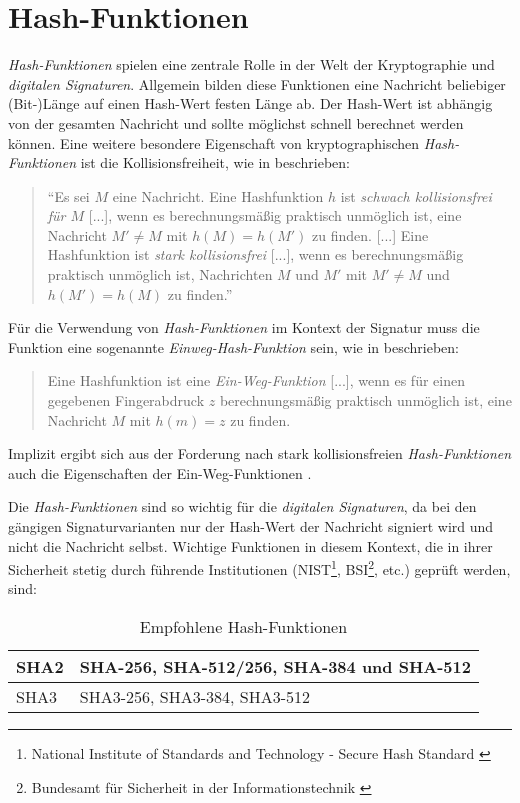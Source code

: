 \documentclass[11pt,a4paper,ngerman]{report}
\begin{document}
\section{Hash-Funktionen}\label{Hash-Funktionen}
\textit{Hash-Funktionen} spielen eine zentrale Rolle in der Welt der Kryptographie und \textit{digitalen Signaturen}. Allgemein bilden diese Funktionen eine Nachricht beliebiger (Bit-)Länge auf einen Hash-Wert festen Länge ab. Der Hash-Wert ist abhängig von der gesamten Nachricht und sollte möglichst schnell berechnet werden können. Eine weitere besondere Eigenschaft von kryptographischen \textit{Hash-Funktionen} ist die Kollisionsfreiheit, wie in \cite[S. 89]{krypt08} beschrieben: 
\begin{quote}
    ``Es sei $M$ eine Nachricht. Eine Hashfunktion $h$ ist \textit{schwach kollisionsfrei für $M$} [...], wenn es berechnungsmäßig praktisch unmöglich ist, eine Nachricht $M' \neq M$ mit $h(M)=h(M')$ zu finden. [...]
    Eine Hashfunktion ist \textit{stark kollisionsfrei} [...], wenn es berechnungsmäßig praktisch unmöglich ist, Nachrichten $M$ und $M'$ mit $M' \neq M$ und $h(M')=h(M)$ zu finden.''
\end{quote}
Für die Verwendung von \textit{Hash-Funktionen} im Kontext der Signatur muss die Funktion eine sogenannte \textit{Einweg-Hash-Funktion} sein, wie in \cite[S. 99]{krypt08} beschrieben:
\begin{quote}
    Eine Hashfunktion ist eine \textit{Ein-Weg-Funktion} [...], wenn es für einen gegebenen Fingerabdruck $z$ berechnungsmäßig praktisch unmöglich ist, eine Nachricht $M$ mit $h(m)=z$ zu finden.
\end{quote}
Implizit ergibt sich aus der Forderung nach stark kollisionsfreien \textit{Hash-Funktionen} auch die Eigenschaften der Ein-Weg-Funktionen \cite[S. 99]{krypt08}.

Die \textit{Hash-Funktionen} sind so wichtig für die \textit{digitalen Signaturen}, da bei den gängigen Signaturvarianten nur der Hash-Wert der Nachricht signiert wird und nicht die Nachricht selbst. Wichtige Funktionen in diesem Kontext, die in ihrer Sicherheit stetig durch führende Institutionen (NIST\footnote{National Institute of Standards and Technology - Secure Hash Standard \cite{shs180-4}}, BSI\footnote{Bundesamt für Sicherheit in der Informationstechnik \cite{bsi-tr-02102-1}}, etc.) geprüft werden, sind:
\begin{table}[h]
    \begin{tabularx}{\textwidth}{ |X|X| }
        \hline
        SHA2 & SHA-256, SHA-512/256, SHA-384 und SHA-512 \\
        \hline
        SHA3 & SHA3-256, SHA3-384, SHA3-512 \\
        \hline
    \end{tabularx}
    \caption{Empfohlene Hash-Funktionen}
    \label{table:Hashfunktionen}
\end{table}
\end{document}
